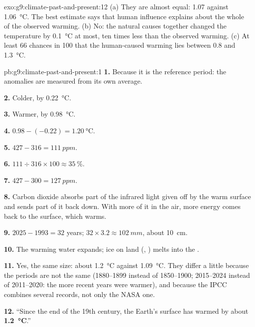 \begin{solution}{exo:g9:climate-past-and-present:12}
(a) They are almost equal: 1.07 against \qty{1.06}{\degreeCelsius}. The
best estimate says that human influence explains about the whole of the
observed warming. (b) No: the natural causes together changed the
temperature by \qty{0.1}{\degreeCelsius} at most, ten times less than the
observed warming. (c) At least 66 chances in 100 that the human-caused
warming lies between 0.8 and \qty{1.3}{\degreeCelsius}.
\end{solution}

\begin{solution}{pb:g9:climate-past-and-present:1}
\textbf{1.} Because it is the reference period: the anomalies are
measured from its own average.

\textbf{2.} Colder, by \qty{0.22}{\degreeCelsius}.

\textbf{3.} Warmer, by \qty{0.98}{\degreeCelsius}.

\textbf{4.} $0.98 - (-0.22) = \qty{1.20}{\degreeCelsius}$.

\textbf{5.} $427 - 316 = \qty{111}{ppm}$.

\textbf{6.} $111 \div 316 \times 100 \approx 35~\%$.

\textbf{7.} $427 - 300 = \qty{127}{ppm}$.

\textbf{8.} Carbon dioxide absorbs part of the infrared light given off by
the warm surface and sends part of it back down. With more of it in the
air, more energy comes back to the surface, which warms.

\textbf{9.} $2025 - 1993 = 32$ years; $32 \times 3.2 \approx
\qty{102}{mm}$, about \qty{10}{cm}.

\textbf{10.} The warming  water expands; ice on land (, ) melts into the .

\textbf{11.} Yes, the same size: about \qty{1.2}{\degreeCelsius} against
\qty{1.09}{\degreeCelsius}. They differ a little because the periods are
not the same (1880--1899 instead of 1850--1900; 2015--2024 instead of
2011--2020: the more recent years were warmer), and because the IPCC
combines several records, not only the NASA one.

\textbf{12.} ``Since the end of the 19th century, the Earth's surface has
warmed by about \textbf{\qty{1.2}{\degreeCelsius}}.''
\end{solution}
